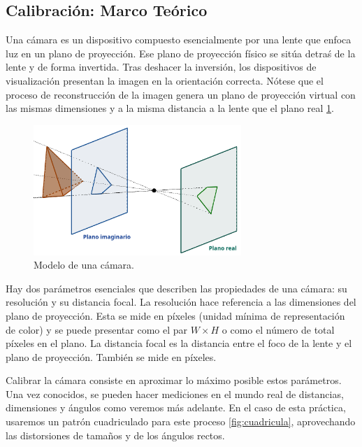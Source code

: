 \documentclass[12pt]{article}
\begin{document}
\subsection{Calibración: Marco Teórico}

Una cámara es un dispositivo compuesto esencialmente por una lente que enfoca luz en un plano de proyección.
Ese plano de proyección físico se sitúa detraś de la lente y de forma invertida. Tras deshacer la inversión, los dispositivos de visualización presentan la imagen en la orientación correcta.
Nótese que el proceso de reconstrucción de la imagen genera un plano de proyección virtual con las mismas dimensiones y a la misma distancia a la lente que el plano real \ref{fig:Modelo_camara}.

\begin{figure}[h!]
    \centering
    \includegraphics[width=0.7\textwidth]{images_calibracion/Modelo_camara.png}  %
    \caption{Modelo de una cámara.}
    \label{fig:Modelo_camara}
\end{figure}

Hay dos parámetros esenciales que describen las propiedades de una cámara: su resolución y su distancia focal. 
La resolución hace referencia a las dimensiones del plano de proyección.
Esta se mide en píxeles (unidad mínima de representación de color) y se puede presentar como el par $W \times H$ o como el número de total píxeles en el plano.
La distancia focal es la distancia entre el foco de la lente y el plano de proyección. También se mide en píxeles.

Calibrar la cámara consiste en aproximar lo máximo posible estos parámetros. Una vez conocidos, se pueden hacer mediciones en el mundo real de distancias, dimensiones y ángulos como veremos más adelante. 
En el caso de esta práctica, usaremos un patrón cuadriculado para este proceso \ref{fig:cuadricula}, aprovechando las distorsiones de tamaños y de los ángulos rectos.
\end{document}
